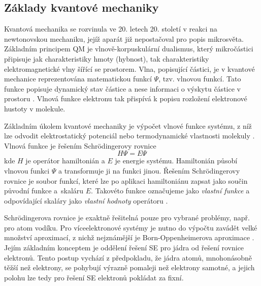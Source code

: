 \subsection{Základy kvantové mechaniky}
Kvantová mechanika se rozvinula ve 20. letech 20. století v reakci na newtonovskou mechaniku, jejíž aparát již nepostačoval pro popis mikrosvěta.  Základním principem QM je vlnově-korpuskulární dualismus, který mikročástici připisuje jak charakteristiky hmoty (hybnost), tak charakteristiky elektromagnetické vlny šířící se prostorem.
Vlna, popisující částici, je v kvantové mechanice reprezentována matematickou funkcí $\Psi$, tzv. vlnovou funkcí. Tato funkce popisuje dynamický stav částice a nese informaci o výskytu částice v prostoru \cite{Cely}. Vlnová funkce elektronu tak přispívá k popisu rozložení elektronové hustoty v molekule. 

Základním úkolem kvantové mechaniky je výpočet vlnové funkce systému, z níž lze odvodit elektrostatický potenciál \cite{elstat_pot} nebo termodynamické vlastnosti molekuly \cite{td}. Vlnová funkce je řešením Schrödingerovy rovnice
\begin{equation}
    H\Psi = E\Psi
\end{equation}
kde $H$ je operátor hamiltonián a $E$ je energie systému. Hamiltonián působí vlnovou funkci $\Psi$ a transformuje ji na funkci jinou. Řešením Schrödingerovy rovnice je soubor funkcí, které lze po aplikaci hamiltoniánu zapsat jako součin původní funkce a~skaláru $E$. Takovéto funkce označujeme jako \textit{vlastní funkce} a odpovídající skaláry jako \textit{vlastní hodnoty} operátoru \cite{Volatron}. 
 
 Schrödingerova rovnice je exaktně řešitelná pouze pro vybrané problémy, např. pro atom vodíku. Pro víceelektronové systémy je nutno do výpočtu zavádět velké množství aproximací, z nichž nejznámější je Born-Oppenheimerova aproximace \cite{BO_approx_Pilar}.
 Jejím základním konceptem je oddělení řešení SE pro jádra od řešení rovnice elektronů. Tento postup vychází z předpokladu, že jádra atomů, mnohonásobně těžší než elektrony, se pohybují výrazně pomaleji než elektrony samotné, a jejich polohu lze tedy pro řešení SE elektronů pokládat za fixní. %
 

